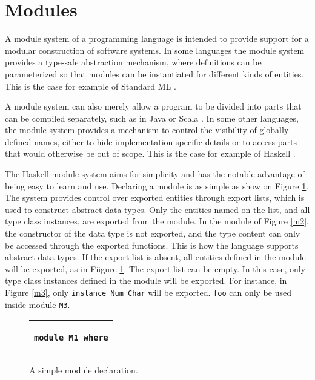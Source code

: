 \documentclass[msc]{ppgccufmg}
\begin{document}
\section{Modules}

A module system of a programming language is intended to provide
support for a modular construction of software systems.  In some
languages the module system provides a type-safe abstraction
mechanism, where definitions can be parameterized so that
modules can be instantiated for different kinds of
entities. This is the case for example of Standard ML \citep{sml}.

A module system can also merely allow a program to
be divided into parts that can be compiled separately, such as in Java \citep{java} or Scala \citep{scala}.
In some other
languages, the module system provides a mechanism to control the
visibility of globally defined names, either to hide
implementation-specific details or to access parts that would
otherwise be out of scope. This is the case for example of Haskell
\citep[chapter~5]{report}.

The Haskell module system aims for simplicity \citep[section~8.2]{history}
and has the notable advantage of being easy to learn and use.
Declaring a module is as simple as show on Figure \ref{module-header}.
The system provides control over exported entities through export lists, which is used to construct abstract data types.
Only the entities named on the list, and all type class instances, are exported from the module.
In the module of Figure \ref{m2}, the constructor of the data type is not exported, and the type content can only be accessed through the exported functions.
This is how the language supports abstract data types.
If the export list is absent, all entities defined in the module will be exported, as in Fiigure \ref{module-header}.
The export list can be empty.
In this case, only type class instances defined in the module will be exported.
For instance, in Figure \ref{m3}, only \texttt{instance Num Char} will be exported.
\texttt{foo} can only be used inside module \texttt{M3}.

\begin{figure}
\caption{A simple module declaration.\label{module-header}}
\begin{tabular}{|p{\textwidth}|}
\hline
\begin{verbatim}
module M1 where
\end{verbatim}
\\
\hline
\end{tabular}
\end{figure}
\end{document}
